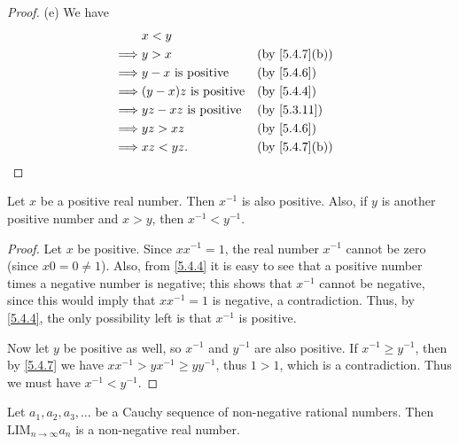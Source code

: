 \begin{proof}{(e)}
	We have
	\begin{align*}
		         & x < y                                                         \\
		\implies & y > x                        &  & \text{(by \cref{5.4.7}(b))} \\
		\implies & y - x \text{ is positive}    &  & \by{5.4.6}                  \\
		\implies & (y - x)z \text{ is positive} &  & \by{5.4.4}                  \\
		\implies & yz - xz \text{ is positive}  &  & \by{5.3.11}                 \\
		\implies & yz > xz                      &  & \by{5.4.6}                  \\
		\implies & xz < yz.                     &  & \text{(by \cref{5.4.7}(b))}
	\end{align*}
\end{proof}

\begin{prop}\label{5.4.8}
	Let \(x\) be a positive real number.
	Then \(x^{-1}\) is also positive.
	Also, if \(y\) is another positive number and \(x > y\), then \(x^{-1} < y^{-1}\).
\end{prop}

\begin{proof}
	Let \(x\) be positive.
	Since \(xx^{-1} = 1\), the real number \(x^{-1}\) cannot be zero (since \(x0 = 0 \neq 1\)).
	Also, from \cref{5.4.4} it is easy to see that a positive number times a negative number is negative;
	this shows that \(x^{-1}\) cannot be negative, since this would imply that \(xx^{-1} = 1\) is negative, a contradiction.
	Thus, by \cref{5.4.4}, the only possibility left is that \(x^{-1}\) is positive.

	Now let \(y\) be positive as well, so \(x^{-1}\) and \(y^{-1}\) are also positive.
	If \(x^{-1} \geq y^{-1}\), then by \cref{5.4.7} we have \(xx^{-1} > yx^{-1} \geq yy^{-1}\), thus \(1 > 1\), which is a contradiction.
	Thus we must have \(x^{-1} < y^{-1}\).
\end{proof}

\begin{prop}\label{5.4.9}
	Let \(a_1, a_2, a_3, \dots\) be a Cauchy sequence of non-negative rational numbers.
	Then \(\text{LIM}_{n \to \infty} a_n\) is a non-negative real number.
\end{prop}

